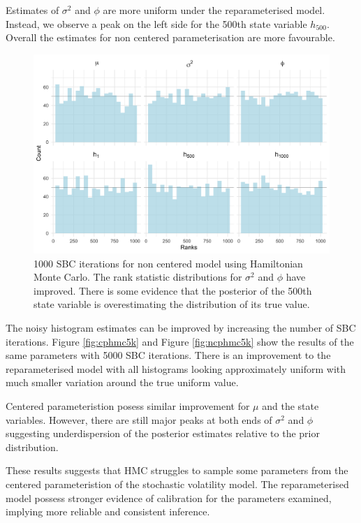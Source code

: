 \documentclass[12pt, a4paper]{article}
\begin{document}
    Estimates of $\sigma^2$ and $\phi$ are more uniform under the reparameterised model. Instead, we observe a peak on the left side for the 500th state variable $h_{500}$. Overall the estimates for non centered parameterisation are more favourable. 

    \begin{figure}[H]
        \centering
        \includegraphics[scale=0.09]{results/hmc_ncp_1k.png}
        \caption{1000 SBC iterations for non centered model using Hamiltonian Monte Carlo. The rank statistic distributions for $\sigma^2$ and $\phi$ have improved. There is some evidence that the posterior of the 500th state variable is overestimating the distribution of its true value.}
        \label{fig:ncphmc1k}
    \end{figure}

    The noisy histogram estimates can be improved by increasing the number of SBC iterations. Figure \ref{fig:cphmc5k} and Figure \ref{fig:ncphmc5k} show the results of the same parameters with 5000 SBC iterations. There is an improvement to the reparameterised model with all histograms looking approximately uniform with much smaller variation around the true uniform value. 
    
    Centered parameteristion posess similar improvement for $\mu$ and the state variables. However, there are still major peaks at both ends of $\sigma^2$ and $\phi$ suggesting underdispersion of the posterior estimates relative to the prior distribution.

    These results suggests that HMC struggles to sample some parameters from the centered parameteristion of the stochastic volatility model. The reparameterised model possess stronger evidence of calibration for the parameters examined, implying more reliable and consistent inference.
\end{document}
